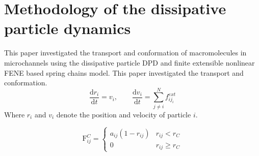 \section{Methodology of the dissipative particle dynamics}\label{sec:mdpd}
This paper investigated the transport and conformation of macromolecules in microchannels using the dissipative particle DPD and finite extensible nonlinear FENE based spring chains model.  This paper investigated the transport and conformation.
\begin{equation}
\frac{\mathrm{d}r_i}{\mathrm{d}t}=v_i,\qquad
\frac{\mathrm{d}v_i}{\mathrm{d}t}=\sum_{j \neq i}^N {f_{{ij}_i}^{ext}}
\end{equation}
Where $r_i$ and $v_i$ denote the position and velocity of particle $i$.

\begin{equation}
\mathrm{F}_{ij}^C=
\left\{\begin{array}{ll}
a_{ij}(1-r_{ij})&r_{ij}<r_C\\
0&r_{ij}\geq r_C
\end{array}\right.
\end{equation}

